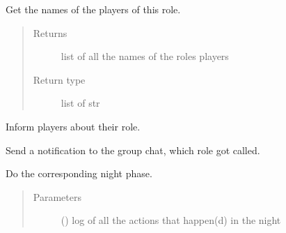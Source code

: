\documentclass[letterpaper,10pt,english]{sphinxmanual}
\begin{document}
\begin{fulllineitems}
\begin{fulllineitems}
\begin{quote}
\begin{description}
\end{description}\end{quote}

\end{fulllineitems}



\begin{fulllineitems}
Get the names of the players of this role.
\begin{quote}\begin{description}
\item[{Returns}] \leavevmode
list of all the names of the roles players

\item[{Return type}] \leavevmode
list of str

\end{description}\end{quote}

\end{fulllineitems}



\begin{fulllineitems}
Inform players about their role.

\end{fulllineitems}



\begin{fulllineitems}
\end{fulllineitems}



\begin{fulllineitems}
Send a notification to the group chat, which role got called.

\end{fulllineitems}



\begin{fulllineitems}
\end{fulllineitems}



\begin{fulllineitems}
Do the corresponding night phase.
\begin{quote}\begin{description}
\item[{Parameters}] \leavevmode
{} ({\hyperref[\detokenize{chatwolf:chatwolf.nightactions.Nightactions}]{}}) \textendash{} log of all the actions that happen(d) in the night


\end{description}
\end{quote}
\end{fulllineitems}
\end{fulllineitems}
\end{document}

